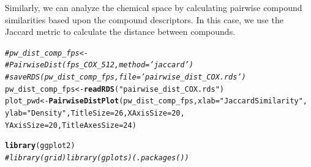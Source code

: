 \documentclass[twoside,a4wide,12pt]{article}\usepackage[]{graphicx}\usepackage[]{color}
\makeatletter
\newcommand{\hlnum}[1]{\textcolor[rgb]{0.686,0.059,0.569}{#1}}%
\newcommand{\hlstr}[1]{\textcolor[rgb]{0.192,0.494,0.8}{#1}}%
\newcommand{\hlcom}[1]{\textcolor[rgb]{0.678,0.584,0.686}{\textit{#1}}}%
\newcommand{\hlstd}[1]{\textcolor[rgb]{0.345,0.345,0.345}{#1}}%
\newcommand{\hlkwb}[1]{\textcolor[rgb]{0.69,0.353,0.396}{#1}}%
\newcommand{\hlkwc}[1]{\textcolor[rgb]{0.333,0.667,0.333}{#1}}%
\newcommand{\hlkwd}[1]{\textcolor[rgb]{0.737,0.353,0.396}{\textbf{#1}}}%
\newenvironment{kframe}{%
 \def\at@end@of@kframe{}%
 \ifinner\ifhmode%
  \def\at@end@of@kframe{\end{minipage}}%
  \begin{minipage}{\columnwidth}%
 \fi\fi%
 \def\FrameCommand##1{\hskip\@totalleftmargin \hskip-\fboxsep
 \colorbox{shadecolor}{##1}\hskip-\fboxsep
     \hskip-\linewidth \hskip-\@totalleftmargin \hskip\columnwidth}%
 \MakeFramed {\advance\hsize-\width
   \@totalleftmargin\z@ \linewidth\hsize
   \@setminipage}}%
 {\par\unskip\endMakeFramed%
 \at@end@of@kframe}
\newenvironment{knitrout}{}{} %
\makeatother
\begin{document}
Similarly, we can analyze the chemical space by calculating pairwise compound similarities based upon the compound descriptors. In this case, we use the Jaccard metric to calculate the distance between compounds.
\begin{knitrout}
\color{fgcolor}\begin{kframe}
\begin{alltt}
\hlcom{# pw_dist_comp_fps <-}
\hlcom{# PairwiseDist(fps_COX_512,method='jaccard')}
\hlcom{# saveRDS(pw_dist_comp_fps,file='pairwise_dist_COX.rds')}
\hlstd{pw_dist_comp_fps} \hlkwb{<-} \hlkwd{readRDS}\hlstd{(}\hlstr{"pairwise_dist_COX.rds"}\hlstd{)}
\hlstd{plot_pwd} \hlkwb{<-} \hlkwd{PairwiseDistPlot}\hlstd{(pw_dist_comp_fps,} \hlkwc{xlab} \hlstd{=} \hlstr{"Jaccard Similarity"}\hlstd{,}
    \hlkwc{ylab} \hlstd{=} \hlstr{"Density"}\hlstd{,} \hlkwc{TitleSize} \hlstd{=} \hlnum{26}\hlstd{,} \hlkwc{XAxisSize} \hlstd{=} \hlnum{20}\hlstd{,}
    \hlkwc{YAxisSize} \hlstd{=} \hlnum{20}\hlstd{,} \hlkwc{TitleAxesSize} \hlstd{=} \hlnum{24}\hlstd{)}

\hlkwd{library}\hlstd{(ggplot2)}
\hlcom{# library(grid) library(gplots) (.packages())}
\end{alltt}
\end{kframe}
\end{knitrout}
\end{document}
